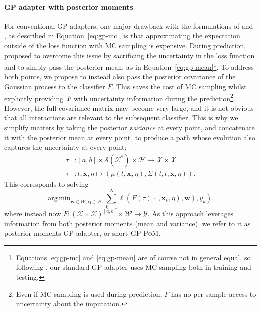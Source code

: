 \documentclass{article}
\DeclareMathOperator*{\argmin}{arg\,min}
\newcommand{\dataspace}{\mathcal{X}}
\newcommand{\lspace}{\mathcal{Y}}
\newcommand{\seriesspace}{\mathcal{S}}
\begin{document}
\paragraph{GP adapter with posterior moments}
%
For conventional GP adapters, one major drawback with the formulations
of \citet{li2016scalable} and \citet{futoma2017mgp}, as described in
Equation~\eqref{eq:gp-mc}, is that approximating the expectation outside
of the loss function with MC sampling is expensive.
%
During prediction, \citet{li2016scalable} proposed to overcome this
issue by sacrificing the uncertainty in the loss function and to simply
pass the posterior mean, as in Equation~\eqref{eq:gp-mean}\footnote{%
  Equations \eqref{eq:gp-mc} and \eqref{eq:gp-mean} are of course not in
  general equal, so following \citet{futoma2017mgp}, our standard GP
  adapter uses MC sampling both in training and testing.
}.
%
To address both points, we propose to instead also pass the posterior
covariance of the Gaussian process to the classifier $F$. This saves the
cost of MC sampling whilst explicitly providing~$F$ with uncertainty
information during the prediction\footnote{%
Even if MC sampling
is used during prediction, $F$ has no per-sample access to
uncertainty about the imputation.
}.
%
However, the full covariance matrix may become very large, and it is
not obvious that all interactions are relevant to the subsequent
classifier.
This is  why we simplify matters by taking the posterior
\emph{variance} at every point, and concatenate it with the posterior
mean at every point, to produce a path whose evolution also captures the
uncertainty at every point:
%
\begin{align}
    \tau &\colon [a, b] \times \seriesspace(\dataspace^*) \times \mathcal{H} \to \dataspace \times \dataspace\\
    \tau &\colon t, \mathbf{x}, \eta \mapsto (\mu(t, \mathbf{x}, \eta), \Sigma(t, t, \mathbf{x}, \eta)).
\end{align}
%
This corresponds to solving
%
\begin{equation}\label{eq:gp-moments}
\argmin_{\mathbf{w} \in \mathcal{W},\bm{\eta} \in \mathcal{H}} \sum_{k=1}^N \ell(F(\tau(\,\cdot\,,\mathbf{x}_k, \eta), \mathbf{w}), y_k),
\end{equation}
%
where instead now $F \colon (\dataspace \times \dataspace)^{[a, b]}
\times \mathcal{W} \to \lspace$.
%
As this approach leverages information from both posterior moments (mean and variance), we refer to it as posterior moments GP adapter, or short \textsc{GP-PoM}.
\end{document}
